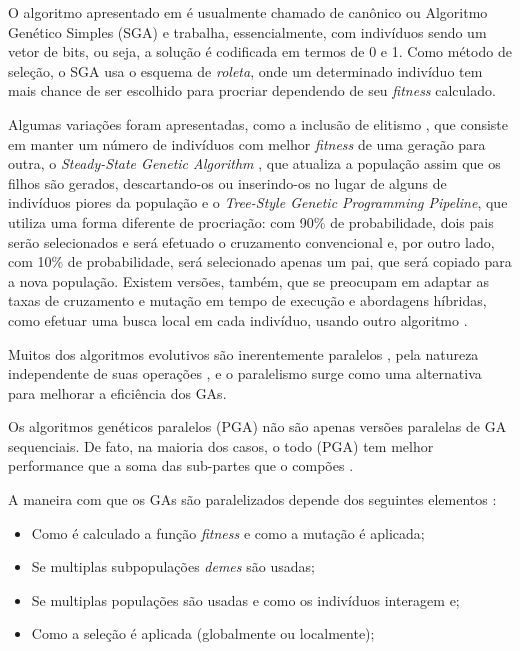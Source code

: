 \documentclass[12pt]{article}
\begin{document}
O algoritmo apresentado em \cite{holland1975} é usualmente chamado de canônico \cite{yang2002} ou Algoritmo Genético Simples (SGA) \cite{gasurvey} e trabalha, essencialmente, com indivíduos sendo um vetor de bits, ou seja, a solução é codificada em termos de 0 e 1. Como método de seleção, o SGA usa o esquema de \emph{roleta}, onde um determinado indivíduo tem mais chance de ser escolhido para procriar dependendo de seu \emph{fitness}
 calculado.

Algumas variações foram apresentadas, como a inclusão de elitismo \cite{dejong1975}, que consiste em manter um número de indivíduos com melhor \emph{fitness} de uma geração para outra, o \emph{Steady-State Genetic Algorithm}  \cite{whitley1988}, que atualiza a população assim que os filhos são gerados, descartando-os ou inserindo-os no lugar de alguns de indivíduos piores da população e o \emph{Tree-Style Genetic Programming Pipeline}, que utiliza uma forma diferente de procriação: com 90\% de probabilidade, dois pais serão selecionados e será efetuado o cruzamento convencional e, por outro lado, com 10\% de probabilidade, será selecionado apenas um pai, que será copiado para a nova população. Existem versões, também, que se preocupam em adaptar as taxas de cruzamento e mutação em tempo de execução e abordagens híbridas, como efetuar uma busca local em cada indivíduo, usando outro algoritmo \cite{bersing1994} \cite{katare2000}.

Muitos dos algoritmos evolutivos são inerentemente paralelos \cite{hoverstad2010}, pela natureza independente de suas operações \cite{albasurvey}, e o paralelismo surge como uma alternativa para melhorar a eficiência dos GAs. 

Os algoritmos genéticos paralelos (PGA) não são apenas versões paralelas de GA sequenciais. De fato, na maioria dos casos, o todo (PGA) tem melhor performance que a soma das sub-partes que o compões \cite{albasurvey}.

A maneira com que os GAs são paralelizados depende dos seguintes elementos \cite{paraleltax}: 
\begin{itemize}
  \item Como é calculado a função \emph{fitness} e como a mutação é aplicada;
  \item Se multiplas subpopulações \emph{demes} são usadas;
  \item Se multiplas populações são usadas e como os indivíduos interagem e;
  \item Como a seleção é aplicada (globalmente ou localmente);
\end{itemize}
\end{document}
